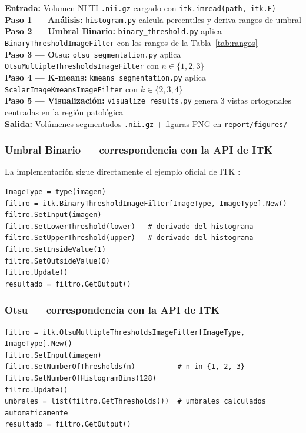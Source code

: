 \documentclass[12pt, a4paper]{article}
\begin{document}
\begin{tcolorbox}[infostyle, title={Pipeline general — los tres métodos}]
\textbf{Entrada:} Volumen NIfTI \texttt{.nii.gz} cargado con \texttt{itk.imread(path, itk.F)}\\[0.3em]
\textbf{Paso 1 — Análisis:} \texttt{histogram.py} calcula percentiles y deriva rangos de umbral\\[0.3em]
\textbf{Paso 2 — Umbral Binario:} \texttt{binary\_threshold.py} aplica \texttt{BinaryThresholdImageFilter}
con los rangos de la Tabla~\ref{tab:rangos}\\[0.3em]
\textbf{Paso 3 — Otsu:} \texttt{otsu\_segmentation.py} aplica \texttt{OtsuMultipleThresholdsImageFilter}
con $n \in \{1, 2, 3\}$\\[0.3em]
\textbf{Paso 4 — K-means:} \texttt{kmeans\_segmentation.py} aplica \texttt{ScalarImageKmeansImageFilter}
con $k \in \{2, 3, 4\}$\\[0.3em]
\textbf{Paso 5 — Visualización:} \texttt{visualize\_results.py} genera 3 vistas ortogonales
centradas en la región patológica\\[0.3em]
\textbf{Salida:} Volúmenes segmentados \texttt{.nii.gz} + figuras PNG en \texttt{report/figures/}
\end{tcolorbox}

\subsubsection{Umbral Binario — correspondencia con la API de ITK}

La implementación sigue directamente el ejemplo oficial de ITK \cite{itkbinary}:

\begin{lstlisting}[caption={Aplicación del BinaryThresholdImageFilter}]
ImageType = type(imagen)
filtro = itk.BinaryThresholdImageFilter[ImageType, ImageType].New()
filtro.SetInput(imagen)
filtro.SetLowerThreshold(lower)   # derivado del histograma
filtro.SetUpperThreshold(upper)   # derivado del histograma
filtro.SetInsideValue(1)
filtro.SetOutsideValue(0)
filtro.Update()
resultado = filtro.GetOutput()
\end{lstlisting}

\subsubsection{Otsu — correspondencia con la API de ITK}

\begin{lstlisting}[caption={Aplicación del OtsuMultipleThresholdsImageFilter}]
filtro = itk.OtsuMultipleThresholdsImageFilter[ImageType, ImageType].New()
filtro.SetInput(imagen)
filtro.SetNumberOfThresholds(n)          # n in {1, 2, 3}
filtro.SetNumberOfHistogramBins(128)
filtro.Update()
umbrales = list(filtro.GetThresholds())  # umbrales calculados automaticamente
resultado = filtro.GetOutput()
\end{lstlisting}
\end{document}
